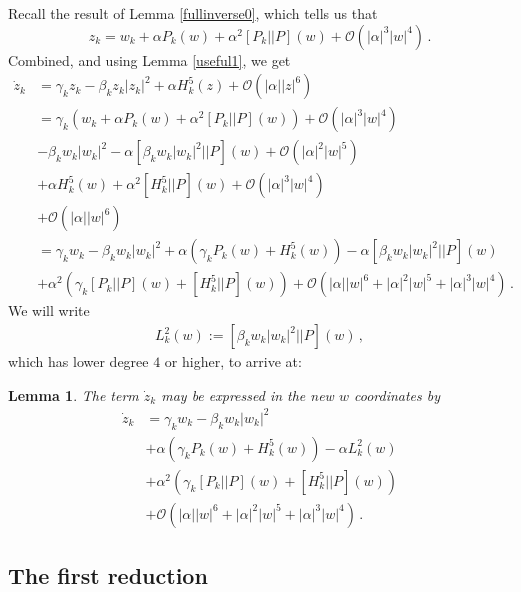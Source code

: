 \documentclass[12pt]{article}
\renewcommand{\mathcal}{\mathscr}
\theoremstyle{plain}
\newtheorem{lem}[thr]{Lemma}
\theoremstyle{definition}
\theoremstyle{remark}
\theoremstyle{remark}
\begin{document}
Recall the result of Lemma \ref{fullinverse0}, which tells us that
\begin{equation}\label{expresssss1225}
z_k = w_k + \alpha P_k(w) + \alpha^2 [P_k||P](w) + \mathcal{O}(|\alpha|^3|w|^4)\, .
\end{equation}
Combined, and using Lemma \ref{useful1}, we get
\begin{align}\label{part2aa}
    \dot{z}_k &= \gamma_kz_k - \beta_k z_k|z_k|^2 + \alpha {H}^5_k(z) + \mathcal{O}(|\alpha||z|^6) \\ \nonumber
    &= \gamma_k(w_k + \alpha P_k(w) + \alpha^2 [P_k||P](w)) + \mathcal{O}(|\alpha|^3|w|^4) \\ \nonumber
    &- \beta_k w_k|w_k|^2 -  \alpha [\beta_k w_k |w_k|^2|| P](w) + \mathcal{O}(|\alpha|^2|w|^5) \\ \nonumber
    &+ \alpha {H}^5_k(w) +\alpha^2[{H}^5_k|| P](w) + \mathcal{O}(|\alpha|^3|w|^4) \\ \nonumber
& + \mathcal{O}(|\alpha||w|^6) \\ \nonumber
&= \gamma_kw_k - \beta_k w_k|w_k|^2 + \alpha(\gamma_kP_k(w) + {H}^5_k(w)) - \alpha [\beta_k w_k |w_k|^2|| P](w) \\ \nonumber
&+ \alpha^2(\gamma_k[P_k||P](w) + [{H}^5_k|| P](w))  + \mathcal{O}(|\alpha||w|^6 + |\alpha|^2|w|^5 + |\alpha|^3|w|^4)\, .
\end{align}
We will write 
\begin{align}
   L^2_k(w) :=  [\beta_k w_k |w_k|^2|| P](w)\, ,
\end{align}
which has lower degree $4$ or higher, to arrive at:
\begin{lem}\label{part2}
The term $\dot{z}_k$ may be expressed in the new $w$ coordinates by
\begin{align}\label{part2tt}
    \dot{z}_k &= \gamma_kw_k - \beta_k w_k|w_k|^2 \\ \nonumber
    &+  \alpha(\gamma_kP_k(w) + {H}^5_k(w))  - \alpha L^2_k(w) \\ \nonumber
  &+ \alpha^2(\gamma_k[P_k||P](w) + [{H}^5_k|| P](w)) \\ \nonumber
& + \mathcal{O}(|\alpha||w|^6 + |\alpha|^2|w|^5 + |\alpha|^3|w|^4)\, .
\end{align}
\end{lem}


\subsection{The first reduction}\label{first2}
\end{document}
